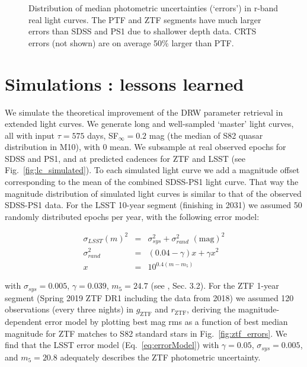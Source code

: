 \documentclass[twocolumn]{aastex62}
\begin{document}
\begin{figure}%
\caption{Distribution of median photometric uncertainties (`errors') in r-band real light curves. The PTF and ZTF segments have much larger errors than SDSS and PS1 due to shallower depth data. CRTS errors (not shown) are on average 50\% larger than PTF.}
\label{fig:lc_errors}
\end{figure} 

%
%
%
%
%

\section{Simulations : lessons learned}\label{sec:simulation}

We simulate the theoretical improvement of the DRW parameter retrieval in extended light curves. We generate long and well-sampled  `master' light curves, all with input $\tau = 575 $ days, SF$_{\infty} = 0.2$ mag (the median of S82 quasar distribution in M10), with 0 mean.  We subsample at real observed epochs for SDSS and PS1, and at predicted cadences for ZTF and LSST  (see Fig.~\ref{fig:lc_simulated}). To each simulated light curve we add a magnitude offset corresponding to the mean of the combined SDSS-PS1 light curve. That way the magnitude distribution of simulated light curves is similar to that of the observed SDSS-PS1 data. For the LSST 10-year segment (finishing in 2031) we assumed 50 randomly distributed  epochs per year, with the following error model:

\begin{eqnarray}
\label{eq:errorModel}
\sigma_{LSST}(m)^{2} &=& \sigma_{sys}^{2} + \sigma_{rand}^{2} \,\, \mathrm{(mag)}^{2} \\
\sigma_{rand}^{2} &=& (0.04-\gamma)x + \gamma x^{2} \nonumber \\
x &=& 10^{0.4(m-m_{5})} \nonumber
\end{eqnarray}

with  $\sigma_{sys} = 0.005$, $\gamma=0.039$, $m_{5} = 24.7$ (see \citealt{ivezic2019}, Sec. 3.2).
For the ZTF 1-year segment (Spring 2019 ZTF DR1 including the data from 2018) we assumed 120 observations (every three nights) in $g_{\mathrm{ZTF}}$ and $r_{\mathrm{ZTF}}$, deriving the magnitude-dependent error model by plotting best mag rms as a function of best median magnitude for ZTF matches to S82 standard stars in Fig.~\ref{fig:ztf_errors}. We find that the LSST error model (Eq.~\ref{eq:errorModel}) with $\gamma = 0.05$, $\sigma_{sys} = 0.005 $, and $m_{5} = 20.8$ adequately describes the ZTF photometric uncertainty. 
\end{document}
